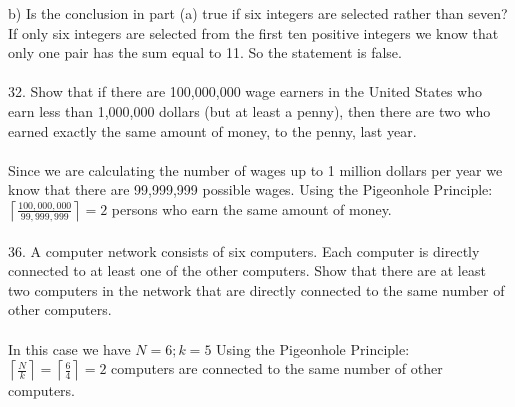 \documentclass[11pt, oneside]{article}   	%
\def\lc{\left\lceil}
\def\rc{\right\rceil}
\begin{document}
b) Is the conclusion in part (a) true if six integers are selected rather than seven?\\
If only six integers are selected from the first ten positive integers we know that only one pair has the sum equal to 11. So the statement is false. \\\\
32. Show that if there are 100,000,000 wage earners in the United States who earn less than 1,000,000 dollars (but at least a penny), then there are two who earned exactly the same amount of money, to the penny, last year. \\\\
Since we are calculating the number of wages up to 1 million dollars per year we know that there are 99,999,999 possible wages. Using the Pigeonhole Principle: 
$\lc\frac{100,000,000}{99,999,999}\rc = 2$ persons who earn the same amount of money.  \\\\
36. A computer network consists of six computers. Each computer is directly connected to at least one of the other computers. Show that there are at least two computers in the network that are directly connected to the same number of other computers.\\\\
In this case we have $N = 6; k = 5$ Using the Pigeonhole Principle: \\
$\lc\frac{N}{k}\rc = \lc\frac{6}{4}\rc = 2$ computers are connected to the same number of other computers. 
\end{document}
